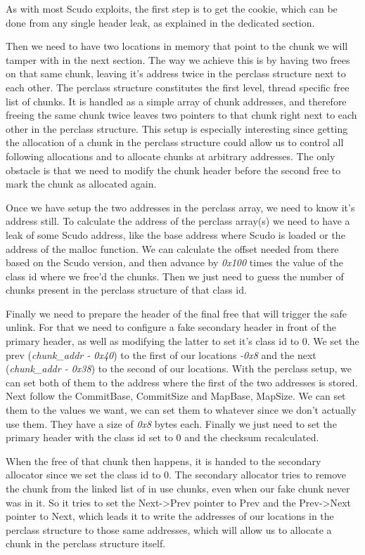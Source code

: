 \documentclass[a4paper,11pt,oneside]{report}
\begin{document}
As with most Scudo exploits, the first step is to get the cookie, which can be done from
any single header leak, as explained in the dedicated section.

Then we need to have two locations in memory that point to the chunk we will tamper with
in the next section. The way we achieve this is by having two frees on that same chunk,
leaving it's address twice in the perclass structure next to each other. The perclass
structure constitutes the first level, thread specific free list of chunks. It is handled
as a simple array of chunk addresses, and therefore freeing the same chunk twice leaves
two pointers to that chunk right next to each other in the perclass structure. This setup
is especially interesting since getting the allocation of a chunk in the perclass
structure could allow us to control all following allocations and to allocate chunks at
arbitrary addresses. The only obstacle is that we need to modify the chunk header before
the second free to mark the chunk as allocated again.

Once we have setup the two addresses in the perclass array, we need to know it's address
still. To calculate the address of the perclass array(s) we need to have a leak of some
Scudo address, like the base address where Scudo is loaded or the address of the malloc
function. We can calculate the offset needed from there based on the Scudo version, and
then advance by \emph{0x100} times the value of the class id where we free'd the
chunks. Then we just need to guess the number of chunks present in the perclass structure
of that class id.

Finally we need to prepare the header of the final free that will trigger the safe
unlink. For that we need to configure a fake secondary header in front of the primary
header, as well as modifying the latter to set it's class id to 0. We set the prev
(\emph{chunk\_addr - 0x40}) to the first of our locations \emph{-0x8} and the next
(\emph{chunk\_addr - 0x38}) to the second of our locations. With the perclass setup, we
can set both of them to the address where the first of the two addresses is stored.  Next
follow the CommitBase, CommitSize and MapBase, MapSize. We can set them to the values we
want, we can set them to whatever since we don't actually use them. They have a size of
\emph{0x8} bytes each.  Finally we just need to set the primary header with the class id
set to 0 and the checksum recalculated.

When the free of that chunk then happens, it is handed to the secondary allocator since we
set the class id to 0. The secondary allocator tries to remove the chunk from the linked
list of in use chunks, even when our fake chunk never was in it. So it tries to set the
Next->Prev pointer to Prev and the Prev->Next pointer to Next, which leads it to write the
addresses of our locations in the perclass structure to those same addresses, which will
allow us to allocate a chunk in the perclass structure itself.
\end{document}
